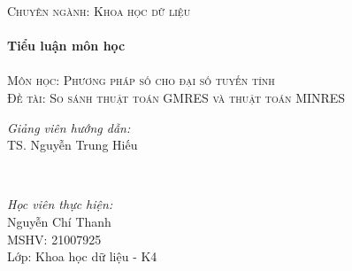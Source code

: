 \documentclass[14pt, a4paper]{article}
\numberwithin{equation}{section}
\numberwithin{algorithm}{section}
\numberwithin{figure}{section}
\numberwithin{dl}{section}
\numberwithin{md}{section}
\numberwithin{bd}{section}
\begin{document}
\begin{titlepage}
    \textsc{\Large Chuyên ngành: Khoa học dữ liệu}\\[0.5cm] %

    
    
    \HRule \\[0.4cm]
    { \huge \bfseries Tiểu luận môn học}\\[0.4cm] %
    \HRule \\[1.5cm]

    \textsc{\Large Môn học: Phương pháp số cho đại số tuyến tính }\\[1.5cm] %


    \textsc{\Large Đề tài: So sánh thuật toán GMRES và thuật toán MINRES }\\[1.5cm]
     

    \begin{minipage}{0.4\textwidth}
        \begin{flushleft} \Large
        \emph{Giảng viên hướng dẫn:} \\
        TS. Nguyễn Trung Hiếu %
        \end{flushleft}
    \end{minipage}\\[2cm]

    \begin{minipage}{0.4\textwidth}
    \begin{flushleft} \Large
    \emph{Học viên thực hiện:}\\
    Nguyễn Chí Thanh \\
    MSHV: 21007925 \\ %
    Lớp: Khoa học dữ liệu - K4
    \end{flushleft}
    \end{minipage}
    
    
    

\end{titlepage}
\end{document}

